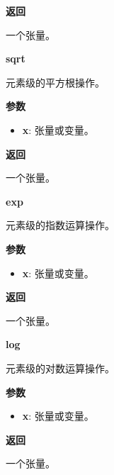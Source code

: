 \textbf{返回}

一个张量。


\textbf{sqrt}\label{sqrt}

\begin{Shaded}
\begin{Highlighting}[]
\end{Highlighting}
\end{Shaded}

元素级的平方根操作。

\textbf{参数}

\begin{itemize}
\tightlist
\item
  \textbf{x}: 张量或变量。
\end{itemize}

\textbf{返回}

一个张量。


\textbf{exp}\label{exp}

\begin{Shaded}
\begin{Highlighting}[]
\end{Highlighting}
\end{Shaded}

元素级的指数运算操作。

\textbf{参数}

\begin{itemize}
\tightlist
\item
  \textbf{x}: 张量或变量。
\end{itemize}

\textbf{返回}

一个张量。


\textbf{log}\label{log}

\begin{Shaded}
\begin{Highlighting}[]
\end{Highlighting}
\end{Shaded}

元素级的对数运算操作。

\textbf{参数}

\begin{itemize}
\tightlist
\item
  \textbf{x}: 张量或变量。
\end{itemize}

\textbf{返回}

一个张量。


